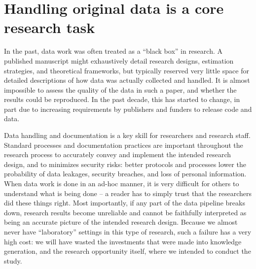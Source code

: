 {%

\section{Handling original data is a core research task}

In the past, data work was often treated as a ``black box'' in research.
A published manuscript might exhaustively detail
research designs, estimation strategies, and theoretical frameworks,
but typically reserved very little space for detailed descriptions
of how data was actually collected and handled.
It is almost impossible to assess the quality of the data in such a paper,
and whether the results could be reproduced.
In the past decade, this has started to change,
in part due to increasing requirements by publishers and funders to release code and data.

Data handling and documentation is a key skill for researchers and research staff.
Standard processes and documentation practices
are important throughout the research process to accurately convey
and implement the intended research design,
and to minimizes security risks: 
better protocols and processes lower the probability of data leakages, 
security breaches, and loss of personal information.
When data work is done in an ad-hoc manner,
it is very difficult for others to understand what is being done --
a reader has to simply trust that the researchers did these things right.
Most importantly, if any part of the data pipeline breaks down,
research results become unreliable
and cannot be faithfully interpreted
as being an accurate picture of the intended research design.
Because we almost never have ``laboratory'' settings
in this type of research,
such a failure has a very high cost:
we will have wasted the investments that were made into knowledge generation,
and the research opportunity itself,
where we intended to conduct the study.

}

